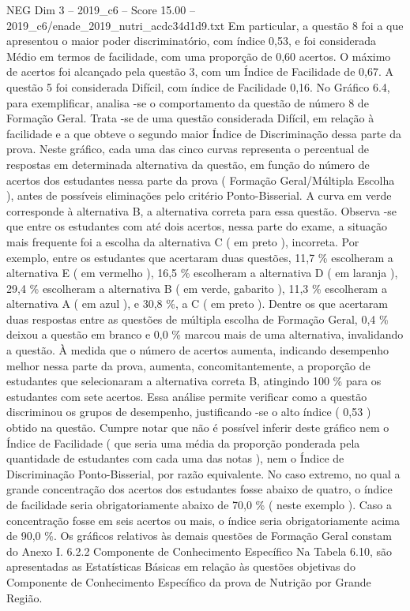 \begin{textsample}{NEG Dim 3 – 2019\_c6 – Score 15.00 – 2019\_c6/enade\_2019\_nutri\_acdc34d1d9.txt}
Em particular, a questão 8 foi a que apresentou o maior poder discriminatório, com índice 0,53, e foi considerada Médio em termos de facilidade, com uma proporção de 0,60 acertos.
O máximo de acertos foi alcançado pela questão 3, com um Índice de Facilidade de 0,67.
A questão 5 foi considerada Difícil, com índice de Facilidade 0,16.
No Gráfico 6.4, para exemplificar, analisa -se o comportamento da questão de número 8 de Formação Geral.
Trata -se de uma questão considerada Difícil, em relação à facilidade e a que obteve o segundo maior Índice de Discriminação dessa parte da prova.
Neste gráfico, cada uma das cinco curvas representa o percentual de respostas em determinada alternativa da questão, em função do número de acertos dos estudantes nessa parte da prova ( Formação Geral/Múltipla Escolha ), antes de possíveis eliminações pelo critério Ponto-Bisserial.
A curva em verde corresponde à alternativa B, a alternativa correta para essa questão.
Observa -se que entre os estudantes com até dois acertos, nessa parte do exame, a situação mais frequente foi a escolha da alternativa C ( em preto ), incorreta.
Por exemplo, entre os estudantes que acertaram duas questões, 11,7 \% escolheram a alternativa E ( em vermelho ), 16,5 \% escolheram a alternativa D ( em laranja ), 29,4 \% escolheram a alternativa B ( em verde, gabarito ), 11,3 \% escolheram a alternativa A ( em azul ), e 30,8 \%, a C ( em preto ).
Dentre os que acertaram duas respostas entre as questões de múltipla escolha de Formação Geral, 0,4 \% deixou a questão em branco e 0,0 \% marcou mais de uma alternativa, invalidando a questão.
À medida que o número de acertos aumenta, indicando desempenho melhor nessa parte da prova, aumenta, concomitantemente, a proporção de estudantes que selecionaram a alternativa correta B, atingindo 100 \% para os estudantes com sete acertos.
Essa análise permite verificar como a questão discriminou os grupos de desempenho, justificando -se o alto índice ( 0,53 ) obtido na questão.
Cumpre notar que não é possível inferir deste gráfico nem o Índice de Facilidade ( que seria uma média da proporção ponderada pela quantidade de estudantes com cada uma das notas ), nem o Índice de Discriminação Ponto-Bisserial, por razão equivalente.
No caso extremo, no qual a grande concentração dos acertos dos estudantes fosse abaixo de quatro, o índice de facilidade seria obrigatoriamente abaixo de 70,0 \% ( neste exemplo ).
Caso a concentração fosse em seis acertos ou mais, o índice seria obrigatoriamente acima de 90,0 \%.
Os gráficos relativos às demais questões de Formação Geral constam do Anexo I. 6.2.2 Componente de Conhecimento Específico Na Tabela 6.10, são apresentadas as Estatísticas Básicas em relação às questões objetivas do Componente de Conhecimento Específico da prova de Nutrição por Grande Região.

\end{textsample}
